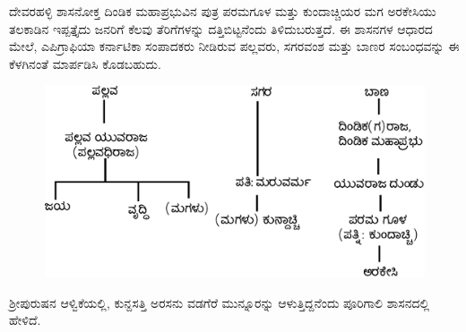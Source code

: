 ದೇವರಹಳ್ಳಿ ಶಾಸನೋಕ್ತ ದಿಂಡಿಕ ಮಹಾಪ್ರಭುವಿನ ಪುತ್ರ ಪರಮಗೂಳ ಮತ್ತು ಕುಂದಾಚ್ಚಿಯರ ಮಗ ಅರಕೇಸಿಯು ತಲಕಾಡಿನ ಇಪ್ಪತ್ತೈದು ಜನರಿಗೆ ಕೆಲವು ತೆರಿಗೆಗಳನ್ನು ದತ್ತಿಬಿಟ್ಟನೆಂದು ತಿಳಿದುಬರುತ್ತದೆ. ಈ ಶಾಸನಗಳ ಆಧಾರದ ಮೇಲೆ, ಎಪಿಗ್ರಾಫಿಯಾ ಕರ್ನಾಟಿಕಾ ಸಂಪಾದಕರು ನೀಡಿರುವ ಪಲ್ಲವರು, ಸಗರವಂಶ ಮತ್ತು ಬಾಣರ ಸಂಬಂಧವನ್ನು ಈ ಕೆಳಗಿನಂತೆ ಮಾರ್ಪಡಿಸಿ ಕೊಡಬಹುದು.

\begin{figure}[!h]
\includegraphics{images/chap2/1.jpg}
\end{figure}

ಶ‍್ರೀಪುರುಷನ ಆಳ್ವಿಕೆಯಲ್ಲಿ, ಕುನ್ದಸತ್ತಿ ಅರಸನು ವಡಗೆರೆ ಮುನ್ನೂರನ್ನು ಆಳುತ್ತಿದ್ದನೆಂದು ಪೂರಿಗಾಲಿ ಶಾಸನದಲ್ಲಿ ಹೇಳಿದೆ.

